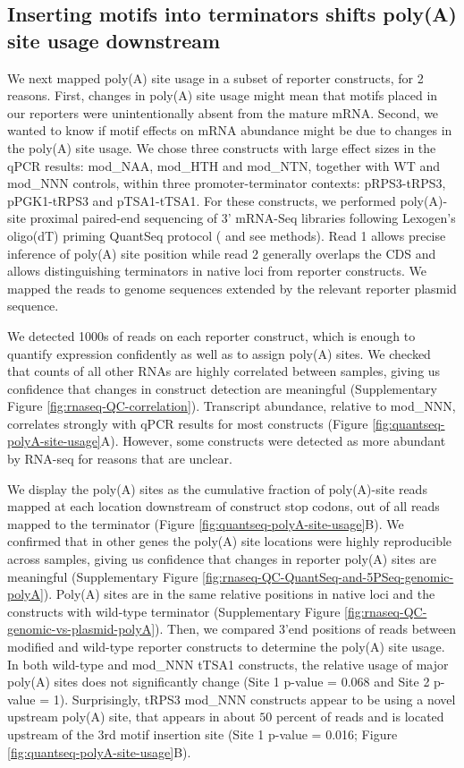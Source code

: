 \documentclass[../main.tex]{subfiles}
\begin{document}
\subsection{Inserting motifs into terminators shifts poly(A) site usage downstream}

We next mapped poly(A) site usage in a subset of reporter constructs, for 2 reasons.
First, changes in poly(A) site usage might mean that motifs placed in our reporters were unintentionally absent from the mature mRNA.
Second, we wanted to know if motif effects on mRNA abundance might be due to changes in the poly(A) site usage.
We chose three constructs with large effect sizes in the qPCR results: mod\_NAA, mod\_HTH and mod\_NTN, together with WT and mod\_NNN controls, within three promoter-terminator contexts: pRPS3-tRPS3, pPGK1-tRPS3 and pTSA1-tTSA1.
For these constructs, we performed poly(A)-site proximal paired-end sequencing of 3' mRNA-Seq libraries following Lexogen's oligo(dT) priming QuantSeq protocol (\cite{Moll2014} and see methods).
Read 1 allows precise inference of poly(A) site position while read 2 generally overlaps the CDS and allows distinguishing terminators in native loci from reporter constructs.
We mapped the reads to genome sequences extended by the relevant reporter plasmid sequence.

We detected 1000s of reads on each reporter construct, which is enough to quantify expression confidently as well as to assign poly(A) sites.
We checked that counts of all other RNAs are highly correlated between samples, giving us confidence that changes in construct detection are meaningful (Supplementary Figure \ref{fig:rnaseq-QC-correlation}).
Transcript abundance, relative to mod\_NNN, correlates strongly with qPCR results for most constructs (Figure \ref{fig:quantseq-polyA-site-usage}A).
However, some constructs were detected as more abundant by RNA-seq for reasons that are unclear.

We display the poly(A) sites as the cumulative fraction of poly(A)-site reads mapped at each location downstream of construct stop codons, out of all reads mapped to the terminator (Figure \ref{fig:quantseq-polyA-site-usage}B).
We confirmed that in other genes the poly(A) site locations were highly reproducible across samples, giving us confidence that changes in reporter poly(A) sites are meaningful (Supplementary Figure \ref{fig:rnaseq-QC-QuantSeq-and-5PSeq-genomic-polyA}).
Poly(A) sites are in the same relative positions in native loci and the constructs with wild-type terminator (Supplementary Figure \ref{fig:rnaseq-QC-genomic-vs-plasmid-polyA}).
Then, we compared 3'end positions of reads between modified and wild-type reporter constructs to determine the poly(A) site usage.
In both wild-type and mod\_NNN tTSA1 constructs, the relative usage of major poly(A) sites does not significantly change (Site 1 p-value = 0.068 and Site 2 p-value = 1).
Surprisingly, tRPS3 mod\_NNN constructs appear to be using a novel upstream poly(A) site, that appears in about \(50%
\) percent of reads and is located upstream of the 3rd motif insertion site (Site 1 p-value = 0.016; Figure \ref{fig:quantseq-polyA-site-usage}B).
\end{document}

